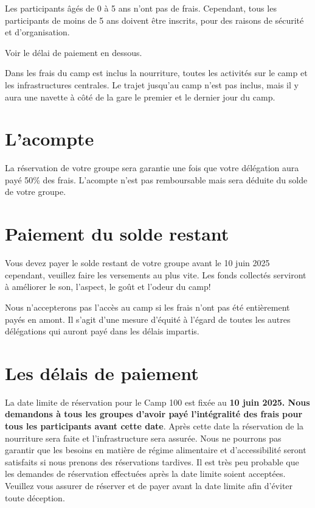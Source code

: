\documentclass[a4paper, 11pt]{report}
\begin{document}
Les participants \^ag\'es de 0 \`a 5 ans n'ont pas de frais. Cependant, tous les participants de moins de 5 ans doivent être inscrits, pour des raisons de s\'ecurit\'e et d'organisation.

Voir le d\'elai de paiement en dessous. 

Dans les frais du camp est inclus la nourriture, toutes les activit\'es sur le camp et les infrastructures centrales. Le trajet jusqu'au camp n'est pas inclus, mais il y aura une navette \`a c\^ot\'e de la gare le premier et le dernier jour du camp. 


\section{L'acompte}
La r\'eservation de votre groupe sera garantie une fois que votre d\'el\'egation aura pay\'e 50\% des frais. L'acompte n'est pas remboursable mais sera d\'eduite du solde de votre groupe.

\section{Paiement du solde restant}
Vous devez payer le solde restant de votre groupe avant le 10 juin 2025 cependant, veuillez faire les versements au plus vite. Les fonds collect\'es serviront \`a am\'eliorer le son, l'aspect, le goût et l'odeur du camp! 

Nous n'accepterons pas l'acc\`es au camp si les frais n'ont pas \'et\'e enti\`erement pay\'es en amont. Il s'agit d'une mesure d'\'equit\'e \`a l'\'egard de toutes les autres d\'el\'egations qui auront pay\'e dans les d\'elais impartis.


\section{Les d\'elais de paiement}
La date limite de r\'eservation pour le Camp 100 est fix\'ee au \textbf{10 juin 2025. Nous demandons \`a tous les groupes d'avoir pay\'e l'int\'egralit\'e des frais pour tous les participants avant cette date}. Apr\`es cette date la r\'eservation de la nourriture sera faite et l'infrastructure sera assur\'ee. Nous ne pourrons pas garantir que les besoins en mati\`ere de r\'egime alimentaire et d'accessibilit\'e seront satisfaits si nous prenons des r\'eservations tardives. Il est tr\`es peu probable que les demandes de r\'eservation effectu\'ees apr\`es la date limite soient accept\'ees. Veuillez vous assurer de r\'eserver et de payer avant la date limite afin d'\'eviter toute d\'eception. 
\end{document}
